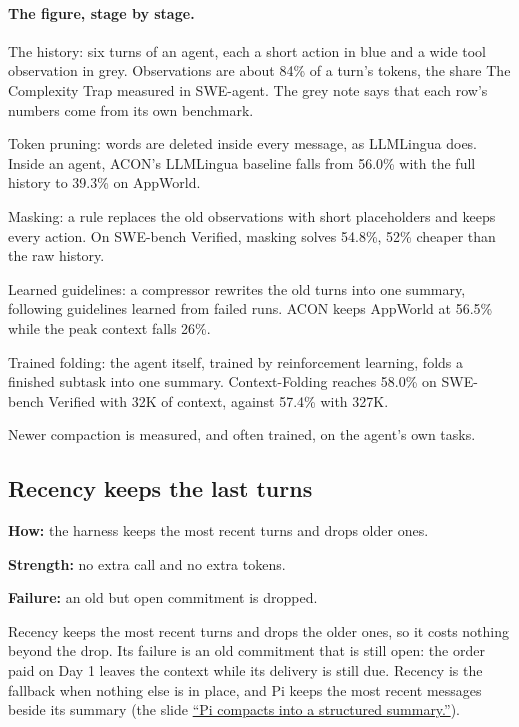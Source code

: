 \paragraph{The figure, stage by stage.}
\be
\item The history: six turns of an agent, each a short action in blue and a wide tool observation in grey. Observations are about 84\% of a turn's tokens, the share The Complexity Trap measured in SWE-agent. The grey note says that each row's numbers come from its own benchmark.
\item Token pruning: words are deleted inside every message, as LLMLingua does. Inside an agent, ACON's LLMLingua baseline falls from 56.0\% with the full history to 39.3\% on AppWorld.
\item Masking: a rule replaces the old observations with short placeholders and keeps every action. On SWE-bench Verified, masking solves 54.8\%, 52\% cheaper than the raw history.
\item Learned guidelines: a compressor rewrites the old turns into one summary, following guidelines learned from failed runs. ACON keeps AppWorld at 56.5\% while the peak context falls 26\%.
\item Trained folding: the agent itself, trained by reinforcement learning, folds a finished subtask into one summary. Context-Folding reaches 58.0\% on SWE-bench Verified with 32K of context, against 57.4\% with 327K.
\ee

\begin{takeaway}Newer compaction is measured, and often trained, on the agent's own tasks.\end{takeaway}

\subsection{Recency keeps the last turns}
\label{sec:it-7-4a}

\bi
\item \textbf{How:} the harness keeps the most recent turns and drops older ones.
\item \textbf{Strength:} no extra call and no extra tokens.
\item \textbf{Failure:} an old but open commitment is dropped.
\ei

Recency keeps the most recent turns and drops the older ones, so it costs nothing beyond the drop. Its failure is an old commitment that is still open: the order paid on Day 1 leaves the context while its delivery is still due. Recency is the fallback when nothing else is in place, and Pi keeps the most recent messages beside its summary (the slide \hyperref[sec:it-7-5a]{``Pi compacts into a structured summary.''}).

